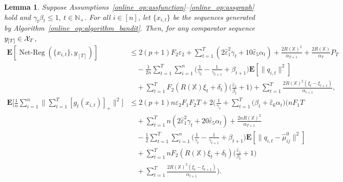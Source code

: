\documentclass[12pt,draftcls,onecolumn]{IEEEtran}%
\newtheorem{lemma}{Lemma}
\DeclareMathOperator{\NetReg}{Net-Reg}
\begin{document}
\begin{lemma}\label{online_op:theoremreg_bandit}
Suppose Assumptions~\ref{online_op:assfunction}--\ref{online_op:assgraph} hold and $\gamma_{t}\beta_{t}\le1,~t\in\mathbb{N}_+$. For all $i\in[n]$, let $\{x_{i,t}\}$ be the sequences generated by Algorithm~\ref{online_op:algorithm_bandit}. Then, for any comparator sequence $y_{[T]}\in{\mathcal{X}}_{T}$,
\begin{align}
\mathbf{E}[\NetReg(\{x_{i,t}\},y_{[T]})]
&\le 2(p+1)F_2\varepsilon_2
+\sum_{t=1}^T(2\hat{\varepsilon}_1^2\gamma_{t}
+10\hat{\varepsilon}_5\alpha_{t})+\frac{2R(\mathbb{X})^2}{\alpha_{T+1}}
+\frac{2R(\mathbb{X})}{\alpha_{T}}P_T\nonumber\\
&\quad-\frac{1}{2n}\sum_{t=1}^T\sum_{i=1}^n\Big(\frac{1}{\gamma_{t}}
-\frac{1}{\gamma_{t+1}}+\beta_{t+1}\Big)\mathbf{E}[\|q_{i,t}\|^2]\nonumber\\
&\quad
+\sum_{t=1}^TF_2(R(\mathbb{X})\xi_{t}+ \delta_{t})\Big(\frac{\hat{\varepsilon}_{1}}{\beta_t}+1\Big)+\sum_{t=1}^T\frac{2R(\mathbb{X})^2(\xi_t-\xi_{t+1})}{\alpha_{t+1}},
\label{online_op:theoremregequ_bandit}\\
\mathbf{E}\Big[\frac{1}{n}\sum_{i=1}^n\Big\|\sum_{t=1}^T[g_{t}(x_{i,t})]_+\Big\|^2\Big]
&\le 2(p+1)n\varepsilon_2F_1F_2T+2\Big(\frac{1}{\gamma_1}
+\sum_{t=1}^T(\beta_{t}+\hat{\varepsilon}_6\alpha_{t}\Big)\Big(nF_1T\nonumber\\
&\quad+\sum_{t=1}^Tn(2\hat{\varepsilon}_1^2\gamma_{t}
+20\hat{\varepsilon}_5\alpha_{t})+\frac{2nR(\mathbb{X})^2}{\alpha_{T+1}}\nonumber\\
&\quad
-\frac{1}{2}\sum_{t=1}^T\sum_{i=1}^n\Big(\frac{1}{\gamma_{t}}
-\frac{1}{\gamma_{t+1}}+\beta_{t+1}\Big)\mathbf{E}[\|q_{i,t}-\hat{\mu}_{ij}^0\|^2]\nonumber\\
&\quad+\sum_{t=1}^TnF_2(R(\mathbb{X})\xi_{t}+ \delta_{t})\Big(\frac{\hat{\varepsilon}_{1}}{\beta_t}+1\Big)\nonumber\\
&\quad+\sum_{t=1}^T\frac{2R(\mathbb{X})^2(\xi_t-\xi_{t+1})}{\alpha_{t+1}}\Big).
\label{online_op:theoremconsequ_bandit}
\end{align}
\end{lemma}
\end{document}

